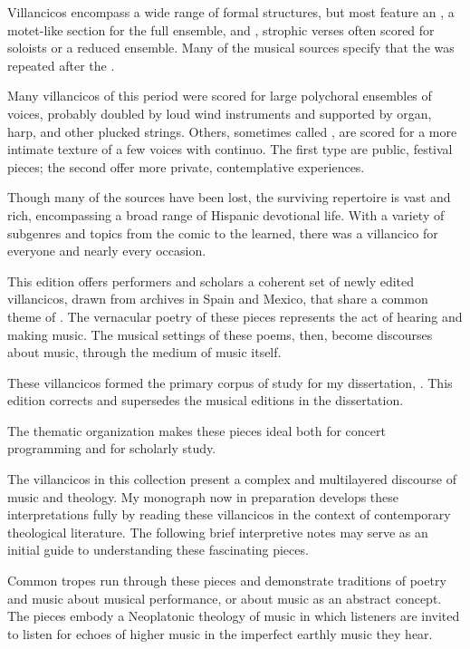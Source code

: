 Villancicos encompass a wide range of formal structures, but most feature an 
, a motet-like section for the full ensemble, and 
, strophic verses often scored for soloists or a reduced ensemble.
Many of the musical sources specify that the  was repeated
after the .

Many villancicos of this period were scored for large polychoral ensembles of 
voices, probably doubled by loud wind instruments and supported by organ, harp, 
and other plucked strings.
Others, sometimes called , are scored for a more intimate 
texture of a few voices with continuo.
The first type are public, festival pieces; the second offer more private, 
contemplative experiences.

Though many of the sources have been lost, the surviving repertoire is vast and 
rich, encompassing a broad range of Hispanic devotional life.
With a variety of subgenres and topics from the comic to the learned, there was 
a villancico for everyone and nearly every occasion.

This edition offers performers and scholars a coherent set of newly edited 
villancicos, drawn from archives in Spain and Mexico, that share a common theme 
of .
The vernacular poetry of these  pieces represents the act 
of hearing and making music.
The musical settings of these poems, then, become discourses about music, 
through the medium of music itself.%
  \begin{Footnote}
      These villancicos formed the primary corpus of study for my dissertation, 
      \autocite{Cashner:PhD}.
      This edition corrects and supersedes the musical editions in the dissertation.
  \end{Footnote}
The thematic organization makes these pieces ideal both for concert programming 
and for scholarly study.


The villancicos in this collection present a complex and multilayered discourse 
of music and theology.
My monograph now in preparation develops these interpretations fully by reading 
these villancicos in the context of contemporary theological literature.
The following brief interpretive notes may serve as an initial guide to 
understanding these fascinating pieces.

Common tropes run through these pieces and demonstrate traditions of poetry and 
music about musical performance, or about music as an abstract concept.
The pieces embody a Neoplatonic theology of music in which listeners are 
invited to listen for echoes of higher music in the imperfect earthly music 
they hear.%
    \Autocite[108--132]{Cashner:PhD}



